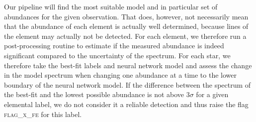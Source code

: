 \documentclass[
  journal=pasa,
  manuscript=research-paper, %
  year=2021,
  volume=37
]{cup-journal}
\begin{document}
Our pipeline will find the most suitable model and in particular set of abundances for the given observation. That does, however, not necessarily mean that the abundance of each element is actually well determined, because lines of the element may actually not be detected. For each element, we therefore run a post-processing routine to estimate if the measured abundance is indeed significant compared to the uncertainty of the spectrum. For each star, we therefore take the best-fit labels and neural network model and assess the change in the model spectrum when changing one abundance at a time to the lower boundary of the neural network model. If the difference between the spectrum of the best-fit and the lowest possible abundance is not above $3\sigma$ for a given elemental label, we do not consider it a reliable detection and thus raise the flag \textsc{flag\_x\_fe} for this label.








\end{document}
